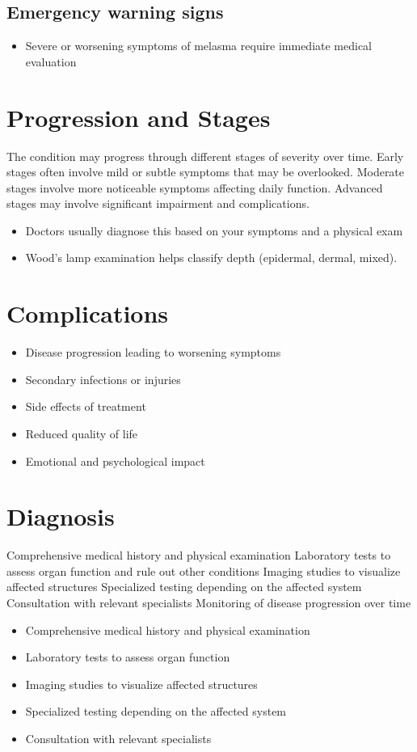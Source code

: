 \subsection{Emergency warning signs}
\begin{itemize}[noitemsep]
  \item Severe or worsening symptoms of melasma require immediate medical evaluation
\end{itemize}
\section{Progression and Stages}
The condition may progress through different stages of severity over time. Early stages often involve mild or subtle symptoms that may be overlooked. Moderate stages involve more noticeable symptoms affecting daily function. Advanced stages may involve significant impairment and complications.

\begin{itemize}[noitemsep]
  \item Doctors usually diagnose this based on your symptoms and a physical exam
  \item Wood's lamp examination helps classify depth (epidermal, dermal, mixed).
\end{itemize}
\section{Complications}
\begin{itemize}[noitemsep]
  \item Disease progression leading to worsening symptoms
  \item Secondary infections or injuries
  \item Side effects of treatment
  \item Reduced quality of life
  \item Emotional and psychological impact
\end{itemize}
\section{Diagnosis}
Comprehensive medical history and physical examination Laboratory tests to assess organ function and rule out other conditions Imaging studies to visualize affected structures Specialized testing depending on the affected system Consultation with relevant specialists Monitoring of disease progression over time

\begin{itemize}[noitemsep]
  \item Comprehensive medical history and physical examination
  \item Laboratory tests to assess organ function
  \item Imaging studies to visualize affected structures
  \item Specialized testing depending on the affected system
  \item Consultation with relevant specialists
\end{itemize}
